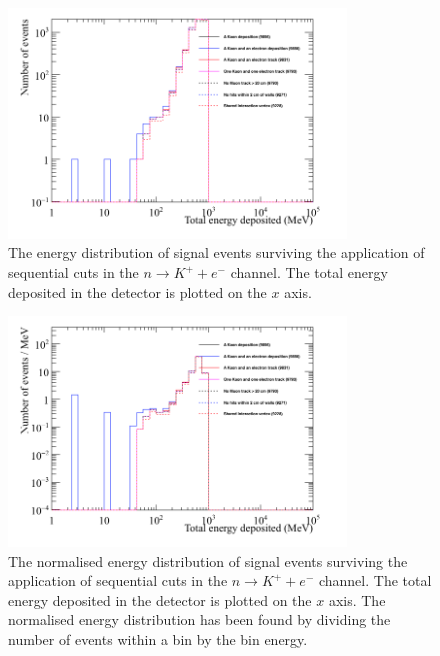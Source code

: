 \begin{figure}[h!]
  \centering
  \includegraphics[width=0.8\textwidth]{NucleonDecay_EnergyDepCuts_Raw}
  \caption[The energy distribution of signal events surviving the application of sequential cuts in the $n \rightarrow K^{+} + e^{-}$ channel]
          {The energy distribution of signal events surviving the application of sequential cuts in the $n \rightarrow K^{+} + e^{-}$ channel. The total energy deposited in the detector is plotted on the $x$ axis.}
  \label{fig:NDK_Sig_Raw}
\end{figure}

\begin{figure}[h!]
  \centering
  \includegraphics[width=0.8\textwidth]{NucleonDecay_EnergyDepCuts_Norm}
  \caption[The normalised energy distribution of signal events surviving the application of sequential cuts in the $n \rightarrow K^{+} + e^{-}$ channel]
          {The normalised energy distribution of signal events surviving the application of sequential cuts in the $n \rightarrow K^{+} + e^{-}$ channel. The total energy deposited in the detector is plotted on the $x$ axis. The normalised energy distribution has been found by dividing the number of events within a bin by the bin energy.}
  \label{fig:NDK_Sig_Norm}
\end{figure}


